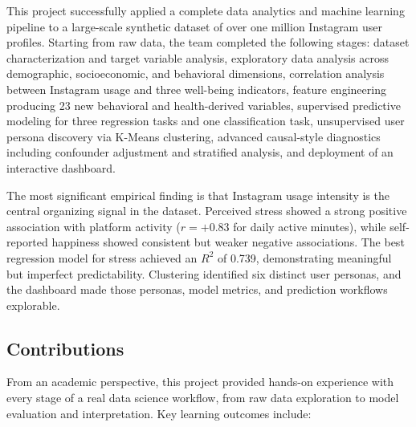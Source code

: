 \documentclass[12pt,a4paper]{article}
\begin{document}
This project successfully applied a complete data analytics and machine learning pipeline to a large-scale synthetic dataset of over one million Instagram user profiles. Starting from raw data, the team completed the following stages: dataset characterization and target variable analysis, exploratory data analysis across demographic, socioeconomic, and behavioral dimensions, correlation analysis between Instagram usage and three well-being indicators, feature engineering producing 23 new behavioral and health-derived variables, supervised predictive modeling for three regression tasks and one classification task, unsupervised user persona discovery via K-Means clustering, advanced causal-style diagnostics including confounder adjustment and stratified analysis, and deployment of an interactive dashboard.
 
The most significant empirical finding is that Instagram usage intensity is the central organizing signal in the dataset. Perceived stress showed a strong positive association with platform activity ($r = +0.83$ for daily active minutes), while self-reported happiness showed consistent but weaker negative associations. The best regression model for stress achieved an $R^2$ of 0.739, demonstrating meaningful but imperfect predictability. Clustering identified six distinct user personas, and the dashboard made those personas, model metrics, and prediction workflows explorable.
 

\subsection{Contributions}
From an academic perspective, this project provided hands-on experience with every stage of a real data science workflow, from raw data exploration to model evaluation and interpretation. Key learning outcomes include:
 
\end{document}
